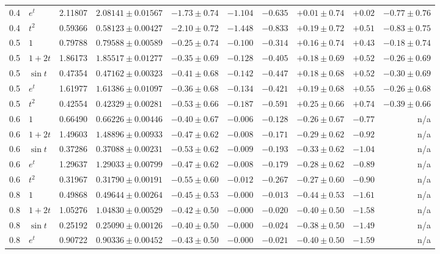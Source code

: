 \documentclass[11pt]{article}
\theoremstyle{remark}
\theoremstyle{definition}
\begin{document}
\begin{table}[t]
\begin{tabular}{@{}llrrrrrrrr@{}}
0.4 & $e^t$ & 2.11807 & $2.08141\pm0.01567$ & $-1.73\pm0.74$ & $-1.104$ & $-0.635$ & $+0.01\pm0.74$ & $+0.02$ & $-0.77\pm0.76$\\
0.4 & $t^2$ & 0.59366 & $0.58123\pm0.00427$ & $-2.10\pm0.72$ & $-1.448$ & $-0.833$ & $+0.19\pm0.72$ & $+0.51$ & $-0.83\pm0.75$\\
\midrule
0.5 & $1$ & 0.79788 & $0.79588\pm0.00589$ & $-0.25\pm0.74$ & $-0.100$ & $-0.314$ & $+0.16\pm0.74$ & $+0.43$ & $-0.18\pm0.74$\\
0.5 & $1+2t$ & 1.86173 & $1.85517\pm0.01277$ & $-0.35\pm0.69$ & $-0.128$ & $-0.405$ & $+0.18\pm0.69$ & $+0.52$ & $-0.26\pm0.69$\\
0.5 & $\sin t$ & 0.47354 & $0.47162\pm0.00323$ & $-0.41\pm0.68$ & $-0.142$ & $-0.447$ & $+0.18\pm0.68$ & $+0.52$ & $-0.30\pm0.69$\\
0.5 & $e^t$ & 1.61977 & $1.61386\pm0.01097$ & $-0.36\pm0.68$ & $-0.134$ & $-0.421$ & $+0.19\pm0.68$ & $+0.55$ & $-0.26\pm0.68$\\
0.5 & $t^2$ & 0.42554 & $0.42329\pm0.00281$ & $-0.53\pm0.66$ & $-0.187$ & $-0.591$ & $+0.25\pm0.66$ & $+0.74$ & $-0.39\pm0.66$\\
\midrule
0.6 & $1$ & 0.66490 & $0.66226\pm0.00446$ & $-0.40\pm0.67$ & $-0.006$ & $-0.128$ & $-0.26\pm0.67$ & $-0.77$ & n/a\\
0.6 & $1+2t$ & 1.49603 & $1.48896\pm0.00933$ & $-0.47\pm0.62$ & $-0.008$ & $-0.171$ & $-0.29\pm0.62$ & $-0.92$ & n/a\\
0.6 & $\sin t$ & 0.37286 & $0.37088\pm0.00231$ & $-0.53\pm0.62$ & $-0.009$ & $-0.193$ & $-0.33\pm0.62$ & $-1.04$ & n/a\\
0.6 & $e^t$ & 1.29637 & $1.29033\pm0.00799$ & $-0.47\pm0.62$ & $-0.008$ & $-0.179$ & $-0.28\pm0.62$ & $-0.89$ & n/a\\
0.6 & $t^2$ & 0.31967 & $0.31790\pm0.00191$ & $-0.55\pm0.60$ & $-0.012$ & $-0.267$ & $-0.27\pm0.60$ & $-0.90$ & n/a\\
\midrule
0.8 & $1$ & 0.49868 & $0.49644\pm0.00264$ & $-0.45\pm0.53$ & $-0.000$ & $-0.013$ & $-0.44\pm0.53$ & $-1.61$ & n/a\\
0.8 & $1+2t$ & 1.05276 & $1.04830\pm0.00529$ & $-0.42\pm0.50$ & $-0.000$ & $-0.020$ & $-0.40\pm0.50$ & $-1.58$ & n/a\\
0.8 & $\sin t$ & 0.25192 & $0.25090\pm0.00126$ & $-0.40\pm0.50$ & $-0.000$ & $-0.024$ & $-0.38\pm0.50$ & $-1.49$ & n/a\\
0.8 & $e^t$ & 0.90722 & $0.90336\pm0.00452$ & $-0.43\pm0.50$ & $-0.000$ & $-0.021$ & $-0.40\pm0.50$ & $-1.59$ & n/a\\

\end{tabular}
\end{table}
\end{document}
